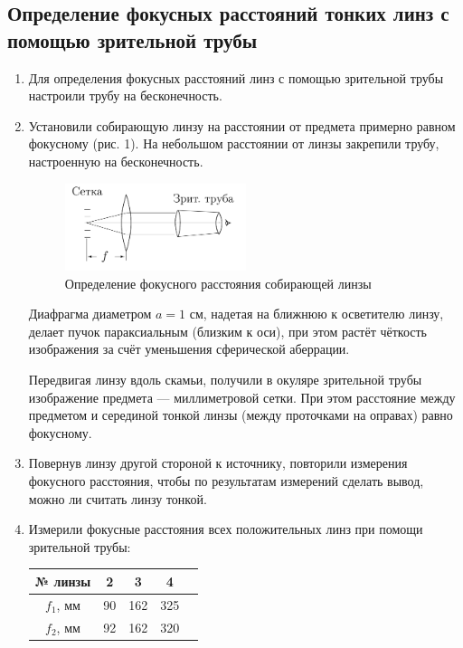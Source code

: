 \documentclass[a4paper, 12pt]{article}%
\begin{document}
	\subsection*{Определение фокусных расстояний тонких линз с помощью зрительной трубы}
	\begin{enumerate}
		\item Для определения фокусных расстояний линз с помощью зрительной трубы настроили трубу на бесконечность.
		
		\item Установили собирающую линзу на расстоянии от предмета примерно равном фокусному (рис. 1). На небольшом расстоянии от линзы закрепили трубу, настроенную на бесконечность.
							
		\begin{figure}
			\begin{center}
				\includegraphics[width = 0.5\textwidth]{images/412-1.png}
				\caption{Определение фокусного расстояния собирающей линзы}
			\end{center}
		\end{figure}
			
		Диафрагма диаметром $a=1$ см, надетая на ближнюю к осветителю линзу, делает пучок параксиальным (близким к оси), при этом растёт чёткость изображения за счёт уменьшения сферической аберрации.
		
		Передвигая линзу вдоль скамьи, получили в окуляре зрительной трубы
		изображение предмета --- миллиметровой сетки. При этом расстояние между
		предметом и серединой тонкой линзы (между проточками на оправах) равно фокусному.
		
		\item Повернув линзу другой стороной к источнику, повторили измерения фокусного расстояния, чтобы по результатам измерений сделать вывод, можно ли считать линзу тонкой.
		
		\item  Измерили фокусные расстояния всех положительных линз при помощи зрительной трубы:
		
		\begin{center}
			\begin{tabular}{|c|c|c|c|c|}
				\hline
				№ линзы & 2 & 3 & 4 \\ \hline
				$f_1$, мм & 90 & 162 & 325 \\ \hline
				$f_2$, мм & 92 & 162 & 320 \\ \hline
			\end{tabular}
		\end{center}
	

\end{enumerate}
\end{document}
